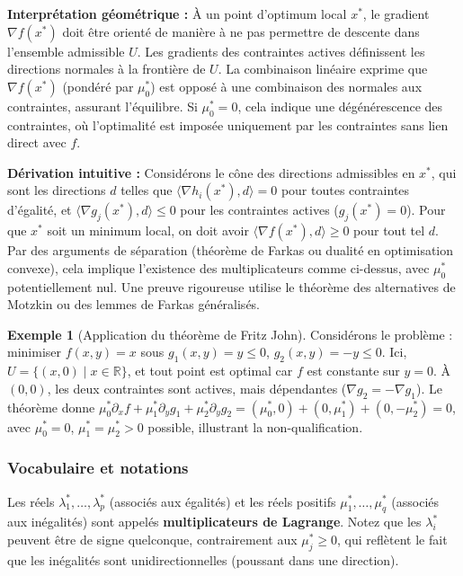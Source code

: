 \documentclass[a4paper,12pt,openany]{book}
\theoremstyle{plain}
\theoremstyle{definition}
\newtheorem{example}[theorem]{Exemple}
\theoremstyle{remark}
\theoremstyle{nbstyle}
\begin{document}
	\textbf{Interprétation géométrique :} À un point d'optimum local \( x^* \), le gradient \( \nabla f(x^*) \) doit être orienté de manière à ne pas permettre de descente dans l'ensemble admissible \( U \). Les gradients des contraintes actives définissent les directions normales à la frontière de \( U \). La combinaison linéaire exprime que \( \nabla f(x^*) \) (pondéré par \( \mu_0^* \)) est opposé à une combinaison des normales aux contraintes, assurant l'équilibre. Si \( \mu_0^* = 0 \), cela indique une dégénérescence des contraintes, où l'optimalité est imposée uniquement par les contraintes sans lien direct avec \( f \).
	
	\textbf{Dérivation intuitive :} Considérons le cône des directions admissibles en \( x^* \), qui sont les directions \( d \) telles que \( \langle \nabla h_i(x^*), d \rangle = 0 \) pour toutes contraintes d'égalité, et \( \langle \nabla g_j(x^*), d \rangle \leq 0 \) pour les contraintes actives (\( g_j(x^*)=0 \)). Pour que \( x^* \) soit un minimum local, on doit avoir \( \langle \nabla f(x^*), d \rangle \geq 0 \) pour tout tel \( d \). Par des arguments de séparation (théorème de Farkas ou dualité en optimisation convexe), cela implique l'existence des multiplicateurs comme ci-dessus, avec \( \mu_0^* \) potentiellement nul. Une preuve rigoureuse utilise le théorème des alternatives de Motzkin ou des lemmes de Farkas généralisés.
	
	\begin{example}[Application du théorème de Fritz John]
		Considérons le problème : minimiser \( f(x,y) = x \) sous \( g_1(x,y) = y \leq 0 \), \( g_2(x,y) = -y \leq 0 \). Ici, \( U = \{ (x,0) \mid x \in \mathbb{R} \} \), et tout point est optimal car \( f \) est constante sur \( y=0 \). À \( (0,0) \), les deux contraintes sont actives, mais dépendantes (\( \nabla g_2 = -\nabla g_1 \)). Le théorème donne \( \mu_0^* \partial_x f + \mu_1^* \partial_y g_1 + \mu_2^* \partial_y g_2 = (\mu_0^*, 0) + (0, \mu_1^*) + (0, -\mu_2^*) = 0 \), avec \( \mu_0^* = 0 \), \( \mu_1^* = \mu_2^* > 0 \) possible, illustrant la non-qualification.
	\end{example}
	
	\subsubsection{Vocabulaire et notations}
	
	Les réels \( \lambda^*_1, \dots, \lambda^*_p \) (associés aux égalités) et les réels positifs \( \mu^*_1, \dots, \mu^*_q \) (associés aux inégalités) sont appelés \textbf{multiplicateurs de Lagrange}. Notez que les \( \lambda_i^* \) peuvent être de signe quelconque, contrairement aux \( \mu_j^* \geq 0 \), qui reflètent le fait que les inégalités sont unidirectionnelles (poussant dans une direction).
	
\end{document}
